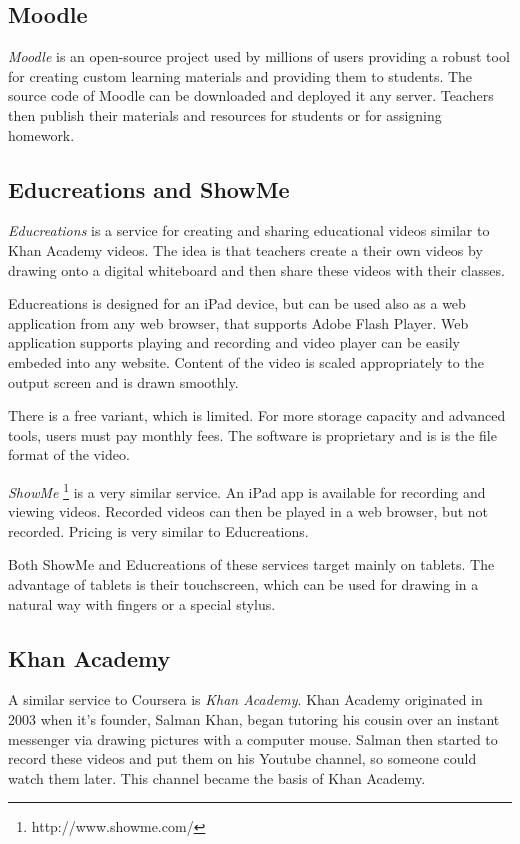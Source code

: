 \subsection{Moodle}
\textit{Moodle} \cite{7} is an open-source project used by millions of users \cite{8} providing a robust tool for creating custom learning materials and providing them to students. The source code of Moodle can be downloaded and deployed it any server. Teachers then publish their materials and resources for students or for assigning homework.




\subsection{Educreations and ShowMe}
\textit{Educreations} is a service for creating and sharing educational videos similar to Khan Academy videos. The idea is that teachers create a their own videos by drawing onto a digital whiteboard and then share these videos with their classes.

Educreations is designed for an iPad device, but can be used also as a web application from any web browser, that supports Adobe Flash Player. Web application supports playing and recording and video player can be easily embeded into any website. Content of the video is scaled appropriately to the output screen and is drawn smoothly.

There is a free variant, which is limited. For more storage capacity and advanced tools, users must pay monthly fees. The software is proprietary and is is the file format of the video.

\textit{ShowMe} \footnote{http://www.showme.com/} is a very similar service. An iPad app is available for recording and viewing videos. Recorded videos can then be played in a web browser, but not recorded. Pricing is very similar to Educreations.

Both ShowMe and Educreations of these services target mainly on tablets. The advantage of tablets is their touchscreen, which can be used for drawing in a natural way with fingers or a special stylus.



\subsection{Khan Academy}
A similar service to Coursera is \textit{Khan Academy}. Khan Academy originated in 2003 when it's founder, Salman Khan, began tutoring his cousin over an instant messenger via drawing pictures with a computer mouse. Salman then started to record these videos and put them on his Youtube channel, so someone could watch them later. This channel became the basis of Khan Academy.

